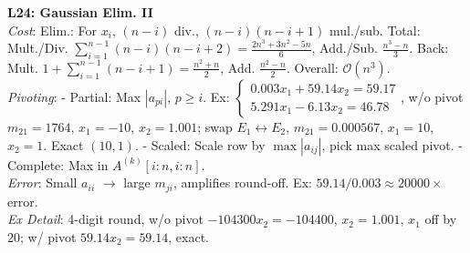 \documentclass[9pt]{article}
\begin{document}
\begin{multicols}{3}
\textbf{L24: Gaussian Elim. II} \\
\textit{Cost}: Elim.: For $x_i$, $(n-i)$ div., $(n-i)(n-i+1)$ mul./sub. Total: Mult./Div. $\sum_{i=1}^{n-1}(n-i)(n-i+2)=\frac{2n^3+3n^2-5n}{6}$, Add./Sub. $\frac{n^3-n}{3}$. Back: Mult. $1+\sum_{i=1}^{n-1}(n-i+1)=\frac{n^2+n}{2}$, Add. $\frac{n^2-n}{2}$. Overall: $\mathcal{O}(n^3)$. \\
\textit{Pivoting}: 
- Partial: Max $|a_{pi}|$, $p \geq i$. Ex: $\begin{cases}0.003x_1+59.14x_2=59.17\\5.291x_1-6.13x_2=46.78\end{cases}$, w/o pivot $m_{21}=1764$, $x_1=-10$, $x_2=1.001$; swap $E_1 \leftrightarrow E_2$, $m_{21}=0.000567$, $x_1=10$, $x_2=1$. Exact $(10,1)$. 
- Scaled: Scale row by $\max|a_{ij}|$, pick max scaled pivot. 
- Complete: Max in $A^{(k)}[i:n,i:n]$. \\
\textit{Error}: Small $a_{ii}$ $\to$ large $m_{ji}$, amplifies round-off. Ex: $59.14/0.003 \approx 20000 \times$ error. \\
\textit{Ex Detail}: 4-digit round, w/o pivot $-104300x_2=-104400$, $x_2=1.001$, $x_1$ off by 20; w/ pivot $59.14x_2=59.14$, exact.


\end{multicols}
\end{document}
